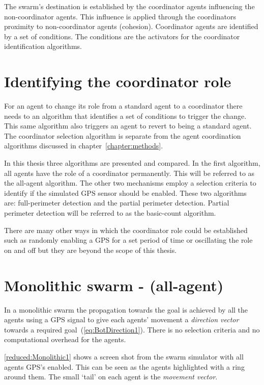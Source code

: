 The swarm's destination is established by the coordinator agents influencing the non-coordinator agents. This influence is applied through the coordinators proximity to non-coordinator agents (cohesion). Coordinator agents are identified by a set of conditions. The conditions are the activators for the coordinator identification algorithms.

\section{Identifying the coordinator role}
For an agent to change its role from a standard agent to a coordinator there needs to an algorithm that identifies a set of conditions to trigger the change. This same algorithm also triggers an agent to revert to being a standard agent. The coordinator selection algorithm is separate from the agent coordination algorithms discussed in chapter~\ref{chapter:methods}.

In this thesis three algorithms are presented and compared. In the first algorithm, all agents have the role of a coordinator permanently. This will be referred to as the all-agent algorithm. The other two mechanisms employ a selection criteria to identify if the simulated GPS sensor should be enabled. These two algorithms are: full-perimeter detection and the partial perimeter detection. Partial perimeter detection will be referred to as the basic-count algorithm.

There are many other ways in which the coordinator role could be established such as randomly enabling a GPS for a set period of time or oscillating the role on and off but they are beyond the scope of this thesis.

\section{Monolithic swarm - (all-agent)} 
In a monolithic swarm \cite{BS:13} the propagation towards the goal is achieved by all the agents using a GPS signal to give each agents' movement a \textit{direction vector} towards a required goal~(\autoref{eq:BotDirection1}). There is no selection criteria and no computational overhead for the agents.

\autoref{reduced:Monolithic1} shows a screen shot from the swarm simulator with all agents GPS's enabled. This can be seen as the agents highlighted with a ring around them. The small `tail' on each agent is the \textit{movement vector}.


